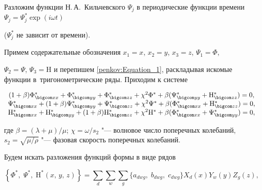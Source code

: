 Разложим функции Н.\,А.~Кильчевского $\Psi_{j}$ в периодические функции времени $\Psi _{j} = \Psi^{*}_{j} \exp({i \omega t})$ 

($\Psi^{*}_{j}$ не зависит от времени). 

Примем содержательные обозначения $x _{1} = x$, $x _{2} = y$, $x _{3} = z$, $\Psi _{1} = \Phi$,

$\Psi _{2} = \Psi$, $\Psi _{3} = \mathrm{H}$ и перепишем \eqref{penkov:Equation_1}, раскладывая искомые функции в~тригонометрические ряды. Приходим к системе

\begin{equation}

\label{penkov:Equation_2}

\begin{array}{c}

{( 1 + \beta ) \Phi ^{*}_{\bigcom xx} + \Phi ^{*}_{\bigcom yy} + \Phi ^{*}_{\bigcom zz} + \chi ^{2} \Phi ^{*} + \beta ( \Psi ^{*}_{\bigcom yy} + \mathrm{H} ^{*}_{\bigcom zz} ) = 0,} \\

{\Psi ^{*}_{\bigcom xx} + ( 1 + \beta ) \Psi ^{*}_{\bigcom yy} + \Psi ^{*}_{\bigcom zz} + \chi ^{2} \Psi ^{*} + \beta ( \Phi ^{*}_{\bigcom xx} + \mathrm{H} ^{*}_{\bigcom zz} ) = 0,} \\

{\mathrm{H} ^{*}_{\bigcom xx} + \mathrm{H} ^{*}_{\bigcom yy} + ( 1 + \beta) \mathrm{H} ^{*}_{\bigcom zz} + \chi ^{2} \mathrm{H} ^{*} + \beta ( \Phi

^{*}_{\bigcom xx} + \Psi ^{*}_{\bigcom yy})=0,}

\end{array}

\end{equation}

где $\beta = ( \lambda + \mu)  / \mu $; $\chi = \omega / s _{2}$ "--- волновое число поперечных колебаний, $s _{2} = \sqrt{\mu

/ \rho}$ "--- фазовая скорость поперечных колебаний.



Будем искать разложения функций формы в виде рядов

\begin{equation} \label{penkov:Equation_4}

\left\{ \Phi^{*}, \; \Psi ^{*}, \; \mathrm{H} ^{*} ( x,\, y,\, z) \right\} = \sum \limits _{d} \sum \limits _{w} \sum \limits

_{g} \{ a _{dwg}, \; b _{dwg}, \; c _{dwg}\} X_{d} ( x ) Y _{w} ( y ) Z_{g}  ( z ),

\end{equation}

